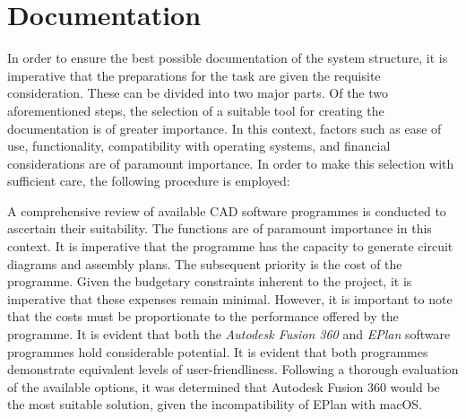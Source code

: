 \chapter{Documentation}

\label{cha:umsetzung}
%
In order to ensure the best possible documentation of the system structure, it is imperative that the preparations for the task are given the requisite consideration. These can be divided into two major parts. Of the two aforementioned steps, the selection of a suitable tool for creating the documentation is of greater importance. In this context, factors such as ease of use, functionality, compatibility with operating systems, and financial considerations are of paramount importance. In order to make this selection with sufficient care, the following procedure is employed:

A comprehensive review of available CAD software programmes is conducted to ascertain their suitability. The functions are of paramount importance in this context. It is imperative that the programme has the capacity to generate circuit diagrams and assembly plans. The subsequent priority is the cost of the programme. Given the budgetary constraints inherent to the project, it is imperative that these expenses remain minimal. However, it is important to note that the costs must be proportionate to the performance offered by the programme. It is evident that both the \textit{Autodesk Fusion 360} and \textit{EPlan} software programmes hold considerable potential. It is evident that both programmes demonstrate equivalent levels of user-friendliness. Following a thorough evaluation of the available options, it was determined that Autodesk Fusion 360 would be the most suitable solution, given the incompatibility of EPlan with macOS.

